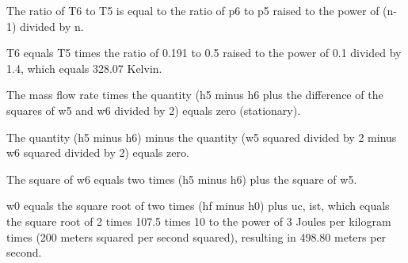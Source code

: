 The ratio of T6 to T5 is equal to the ratio of p6 to p5 raised to the power of (n-1) divided by n.

T6 equals T5 times the ratio of 0.191 to 0.5 raised to the power of 0.1 divided by 1.4, which equals 328.07 Kelvin.

The mass flow rate times the quantity (h5 minus h6 plus the difference of the squares of w5 and w6 divided by 2) equals zero (stationary).

The quantity (h5 minus h6) minus the quantity (w5 squared divided by 2 minus w6 squared divided by 2) equals zero.

The square of w6 equals two times (h5 minus h6) plus the square of w5.

w0 equals the square root of two times (hf minus h0) plus uc, ist, which equals the square root of 2 times 107.5 times 10 to the power of 3 Joules per kilogram times (200 meters squared per second squared), resulting in 498.80 meters per second.